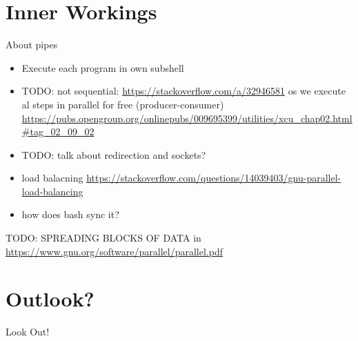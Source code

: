 \section{Inner Workings}
\begin{frame}{About pipes}
\begin{itemize}
   \item Execute each program in own subshell
   \item TODO: not sequential: \url{https://stackoverflow.com/a/32946581} os we execute al steps in parallel for free (producer-consumer) \url{https://pubs.opengroup.org/onlinepubs/009695399/utilities/xcu_chap02.html\#tag_02_09_02}
   \item TODO: talk about redirection and sockets?
   \item load balacning \url{https://stackoverflow.com/questions/14039403/gnu-parallel-load-balancing}
   \item how does bash sync it?
\end{itemize}
\end{frame}
\begin{frame}
 TODO: SPREADING BLOCKS OF DATA
 in \url{https://www.gnu.org/software/parallel/parallel.pdf}
\end{frame}

\section{Outlook?}
\begin{frame}{Look Out!}
\end{frame}

